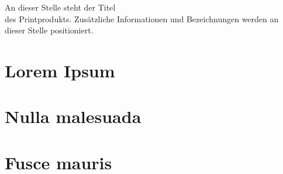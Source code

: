 \documentclass[11pt, a4paper]{article}
\begin{document}
  {An dieser Stelle steht der Titel \\ des Printprodukts.} %
  {Zusätzliche Informationen und Bezeichnungen werden an dieser Stelle positioniert.} %

\section{Lorem Ipsum}
\lipsum[1-2]
\section{Nulla malesuada}
\lipsum[3-4]
\section{Fusce mauris}
\lipsum[5-6]
\end{document}
